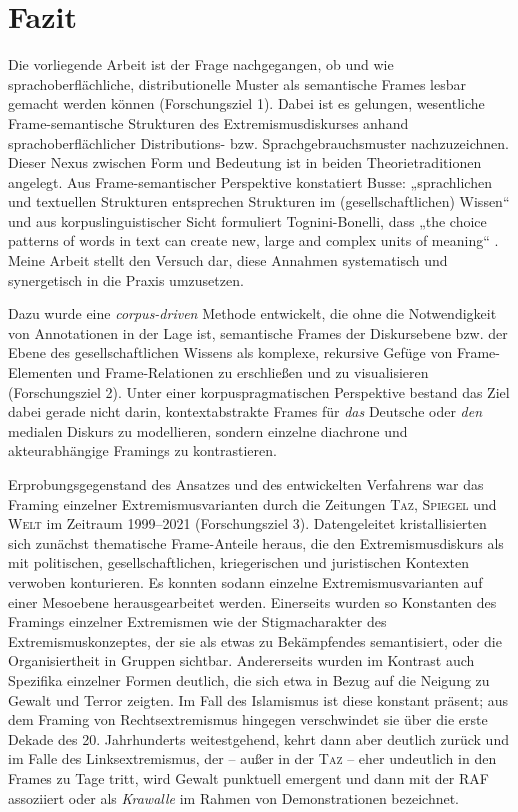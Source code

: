 \section{Fazit}\label{fazit-8}

Die vorliegende Arbeit ist der Frage nachgegangen, ob und wie sprachoberflächliche, distributionelle Muster als semantische Frames lesbar gemacht werden können (Forschungsziel 1). Dabei ist es gelungen, wesentliche Frame-semantische Strukturen des Extremismusdiskurses anhand sprachoberflächlicher Distributions- bzw. Sprachgebrauchsmuster nachzuzeichnen. Dieser Nexus zwischen Form und Bedeutung ist in beiden Theorietraditionen angelegt. Aus Frame-semantischer Perspektive konstatiert Busse: „sprachlichen und textuellen Strukturen entsprechen Strukturen im (gesellschaftlichen) Wissen`` \autocite*[164]{busseDiskursSpracheGesellschaftliches2013} und aus korpuslinguistischer Sicht formuliert Tognini-Bonelli, dass „the choice patterns of words in text can create new, large and complex units of meaning`` \autocite*[101]{tognini-bonelliCorpusLinguisticsWork2001}. Meine Arbeit stellt den Versuch dar, diese Annahmen systematisch und synergetisch in die Praxis umzusetzen.

Dazu wurde eine \emph{corpus-driven} Methode entwickelt, die ohne die Notwendigkeit von Annotationen in der Lage ist, semantische Frames der Diskursebene bzw. der Ebene des gesellschaftlichen Wissens als komplexe, rekursive Gefüge von Frame-Elementen und Frame-Relationen zu erschließen und zu visualisieren (Forschungsziel 2). Unter einer korpuspragmatischen Perspektive bestand das Ziel dabei gerade nicht darin, kontextabstrakte Frames für \emph{das} Deutsche oder \emph{den} medialen Diskurs zu modellieren, sondern einzelne diachrone und akteurabhängige Framings zu kontrastieren.

Erprobungsgegenstand des Ansatzes und des entwickelten Verfahrens war das Framing einzelner Extremismusvarianten durch die Zeitungen \textsc{Taz}, \textsc{Spiegel} und \textsc{Welt} im Zeitraum 1999--2021 (Forschungsziel 3). Datengeleitet kristallisierten sich zunächst thematische Frame-Anteile heraus, die den Extremismusdiskurs als mit politischen, gesellschaftlichen, kriegerischen und juristischen Kontexten verwoben konturieren. Es konnten sodann einzelne Extremismusvarianten auf einer Mesoebene herausgearbeitet werden. Einerseits wurden so Konstanten des Framings einzelner Extremismen wie der Stigmacharakter des Extremismuskonzeptes, der sie als etwas zu Bekämpfendes semantisiert, oder die Organisiertheit in Gruppen sichtbar. Andererseits wurden im Kontrast auch Spezifika einzelner Formen deutlich, die sich etwa in Bezug auf die Neigung zu Gewalt und Terror zeigten. Im Fall des Islamismus ist diese konstant präsent; aus dem Framing von Rechtsextremismus hingegen verschwindet sie über die erste Dekade des 20. Jahrhunderts weitestgehend, kehrt dann aber deutlich zurück und im Falle des Linksextremismus, der -- außer in der \textsc{Taz} -- eher undeutlich in den Frames zu Tage tritt, wird Gewalt punktuell emergent und dann mit der RAF assoziiert oder als \emph{Krawalle} im Rahmen von Demonstrationen bezeichnet.

